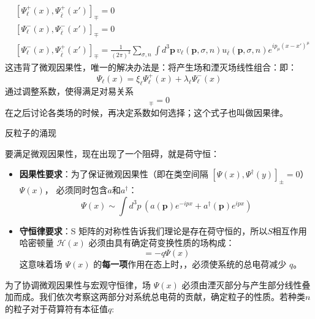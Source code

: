 \begin{subequations}
\begin{align}
    &[\Psi^+_\ell(x), \Psi^+_{\bar{\ell}}(x')]_{\mp}= 0 \\
    &[\Psi^-_\ell(x), \Psi^-_{\bar{\ell}}(x')]_{\mp}  = 0 \\
    &[\Psi^-_\ell(x), \Psi^+_{\bar{\ell}}(x')]_{\mp} = 
    \frac{1}{(2\pi)^3}\sum_{\sigma,n}\int d^3 \boldsymbol{p}\,v_\ell(\boldsymbol{p},\sigma,n)u_{\bar{\ell}}(\boldsymbol{p},\sigma,n)e^{ip_\mu(x-x')^\mu}
\end{align}
\end{subequations}
这违背了微观因果性，唯一的解决办法是：将产生场和湮灭场线性组合：即：
\begin{equation}
    \Psi_\ell(x)=\xi_\ell\Psi^+_\ell(x)+\lambda _\ell\Psi^{-}_\ell(x)
\end{equation}
通过调整系数，使得满足对易关系
\begin{equation}
    [\Psi_\ell(x), \Psi_{\bar{\ell}}(x')]_{\mp} = 0
\end{equation}
在之后讨论各类场的时候，再决定系数如何选择；这个式子也叫做因果律。
\vspace{2ex}
\begin{center}
    \large 反粒子的涌现
\end{center}
\vspace{2ex}
要满足微观因果性，现在出现了一个阻碍，就是荷守恒：
\begin{itemize}
    \item \textbf{因果性要求}：为了保证微观因果性（即在类空间隔 $[\Psi(x), \Psi^\dagger(y)]_{\pm} = 0$） $\Psi(x)$， 必须同时包含$a$和$a^\dagger$：
    \begin{equation}
        \Psi(x) \sim \int d^3p \, \left( a(\mathbf{p}) e^{-ipx} + a^\dagger(\mathbf{p}) e^{ipx} \right)
    \end{equation}
    \item \textbf{守恒律要求}：S 矩阵的对称性告诉我们理论是存在荷守恒的，所以$S$相互作用哈密顿量 $\mathscr{H}(x)$ 必须由具有确定荷变换性质的场构成：
    \begin{equation}
        [Q, \Psi(x)] = -q \Psi(x)
    \end{equation}
    这意味着场 $\Psi(x)$ 的\textbf{每一项}作用在态上时，，必须使系统的总电荷减少 $q$。
\end{itemize}
为了协调微观因果性与宏观守恒律，场 $\Psi(x)$ 必须由湮灭部分与产生部分线性叠加而成。我们依次考察这两部分对系统总电荷的贡献，确定粒子的性质。若种类$n$的粒子对于荷算符有本征值$q$:
